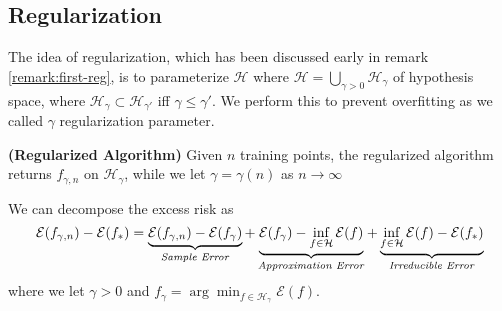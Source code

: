 \subsection{Regularization}
\begin{remark}
    The idea of regularization, which has been discussed early in remark \ref{remark:first-reg}, is to parameterize $ \mathcal{H} $ where $\mathcal{H} = \bigcup_{\gamma>0}\mathcal{H}_\gamma$ of hypothesis space, where $\mathcal{H}_\gamma\subset\mathcal{H}_{\gamma'}$ iff $\gamma\le\gamma'$. We perform this to prevent overfitting as we called $\gamma$ regularization parameter.
\end{remark}

\begin{definition}{\textbf{(Regularized Algorithm)}}
    Given $n$ training points, the regularized algorithm returns $f_{\gamma, n}$ on $\mathcal{H}_\gamma$, while we let $\gamma=\gamma(n)$ as $n\rightarrow\infty$
\end{definition}

\begin{proposition}
    We can decompose the excess risk as
    \begin{equation*}
        \mathcal{E}(f_{\gamma,n}) - \mathcal{E}(f_*) = \underbrace{\mathcal{E}(f_{\gamma, n}) - \mathcal{E}(f_\gamma)}_{\text{\emph{Sample Error}}} + \underbrace{\mathcal{E}(f_\gamma) - \inf_{f\in\mathcal{H}} \mathcal{E}(f)}_{\text{\emph{Approximation Error}}} + \underbrace{\inf_{f\in\mathcal{H}}\mathcal{E}(f) - \mathcal{E}(f_*)}_{\text{\emph{Irreducible Error}}} 
    \end{equation*}
    where we let $\gamma>0$ and $f_\gamma=\arg\min_{f\in\mathcal{H}_\gamma}\mathcal{E}(f)$.
\end{proposition}


